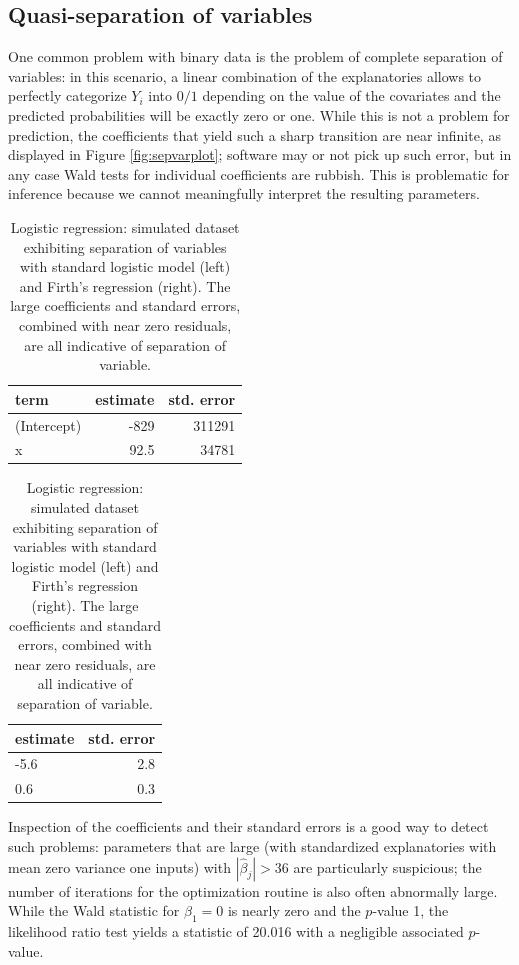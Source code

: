 \documentclass[
  11pt,
  letterpaper,
]{book}
\theoremstyle{definition}
\theoremstyle{definition}
\theoremstyle{definition}
\theoremstyle{remark}
\begin{document}
\hypertarget{quasi-separation-of-variables}{%
\subsection{Quasi-separation of variables}\label{quasi-separation-of-variables}}

One common problem with binary data is the problem of complete
separation of variables: in this scenario, a linear combination of the
explanatories allows to perfectly categorize \(Y_i\) into \(0/1\) depending
on the value of the covariates and the predicted probabilities will be
exactly zero or one. While this is not a problem for prediction, the
coefficients that yield such a sharp transition are near infinite, as
displayed in Figure \ref{fig:sepvarplot}; software may or not pick up
such error, but in any case Wald tests for individual coefficients are
rubbish. This is problematic for inference because we cannot
meaningfully interpret the resulting parameters.

\begin{table}
\caption{\label{tab:quasisepvar}Logistic regression: simulated dataset exhibiting separation of variables with standard logistic model (left) and Firth's regression (right). The large coefficients and standard errors, combined with near zero residuals, are all indicative of separation of variable.}

\centering
\begin{tabular}[t]{lrr}
\toprule
term & estimate & std. error\\
\midrule
(Intercept) & -829 & 311291\\
x & 92.5 & 34781\\
\bottomrule
\end{tabular}
\centering
\begin{tabular}[t]{lr}
\toprule
estimate & std. error\\
\midrule
-5.6 & 2.8\\
0.6 & 0.3\\
\bottomrule
\end{tabular}
\end{table}

Inspection of the coefficients and their standard errors is a good way to detect such problems: parameters that are large (with standardized explanatories with mean zero variance one inputs) with \(|\widehat{\beta}_j| > 36\) are particularly suspicious; the number of iterations for the optimization routine is also often abnormally large. While the Wald statistic for \(\beta_1=0\) is nearly zero and the \(p\)-value 1, the likelihood ratio test yields a statistic of 20.016 with a negligible associated \(p\)-value.
\end{document}
